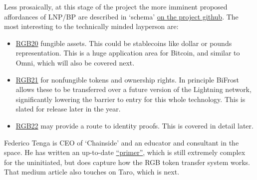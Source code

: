 Less prosaically, at this stage of the project the more imminent proposed affordances of LNP/BP are described in `schema' \href{https://github.com/LNP-BP/LNPBPs}{on the project github}. The most interesting to the technically minded layperson are:
\begin{itemize}
\item \href{https://github.com/LNP-BP/LNPBPs/blob/master/lnpbp-0020.md}{RGB20} fungible assets. This could be stablecoins like dollar or pounds representation. This is a huge application area for Bitcoin, and similar to Omni, which will also be covered next.
\item \href{https://github.com/LNP-BP/LNPBPs/blob/master/lnpbp-0021.md}{RGB21} for nonfungible tokens and ownership rights. In principle BiFrost allows these to be transferred over a future version of the Lightning network, significantly lowering the barrier to entry for this whole technology. This is slated for release later in the year.
\item \href{https://github.com/LNP-BP/LNPBPs/issues/29}{RGB22} may provide a route to identity proofs. This is covered in detail later.
\end{itemize}
Federico Tenga is CEO of `Chainside' and an educator and consultant in the space. He has written an up-to-date \href{https://medium.com/@FedericoTenga/understanding-rgb-protocol-7dc7819d3059}{``primer''}, which is still extremely complex for the uninitiated, but does capture how the RGB token transfer system works. That medium article also touches on Taro, which is next.
